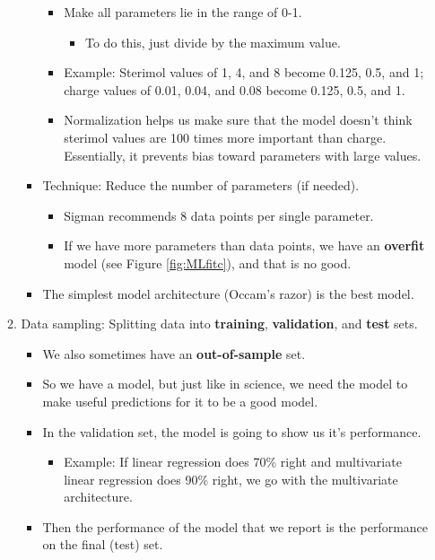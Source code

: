 \documentclass[../notes.tex]{subfiles}
\begin{document}
\begin{itemize}
\begin{enumerate}[start=0]
\begin{itemize}
\begin{itemize}
                \item Make all parameters lie in the range of 0-1.
                \begin{itemize}
                    \item To do this, just divide by the maximum value.
                \end{itemize}
                \item Example: Sterimol values of 1, 4, and 8 become 0.125, 0.5, and 1; charge values of 0.01, 0.04, and 0.08 become 0.125, 0.5, and 1.
                \item Normalization helps us make sure that the model doesn't think sterimol values are 100 times more important than charge. Essentially, it prevents bias toward parameters with large values.
            \end{itemize}
            \item Technique: Reduce the number of parameters (if needed).
            \begin{itemize}
                \item Sigman recommends 8 data points per single parameter.
                \item If we have more parameters than data points, we have an \textbf{overfit} model (see Figure \ref{fig:MLfitc}), and that is no good.
            \end{itemize}
            \item The simplest model architecture (Occam's razor) is the best model.
        \end{itemize}
        \item Data sampling: Splitting data into \textbf{training}, \textbf{validation}, and \textbf{test} sets.
        \begin{itemize}
            \item We also sometimes have an \textbf{out-of-sample} set.
            \item So we have a model, but just like in science, we need the model to make useful predictions for it to be a good model.
            \item In the validation set, the model is going to show us it's performance.
            \begin{itemize}
                \item Example: If linear regression does 70\% right and multivariate linear regression does 90\% right, we go with the multivariate architecture.
            \end{itemize}
            \item Then the performance of the model that we report is the performance on the final (test) set.

\end{itemize}
\end{enumerate}
\end{itemize}
\end{document}
